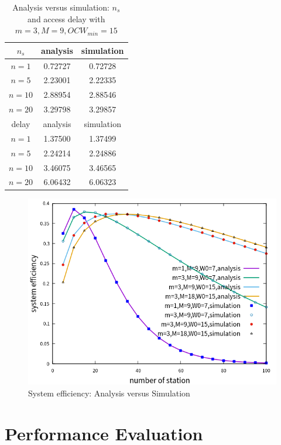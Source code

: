 \documentclass[journal]{IEEEtran}
\begin{document}
\begin{table}[!h]
\caption{Analysis versus simulation: $n_s$ and access delay with $m=3,M=9,OCW_{min} = 15$}
\label{table_val}
\begin{center}
\begin{tabular}{c|c|c}
\hline
$n_s$ 	& analysis 	& simulation \\
\hline
$n=1$ 	& 0.72727  	& 0.72728 \\
$n=5$ 	& 2.23001	& 2.22335 \\
$n=10$	& 2.88954	& 2.88546 \\
$n=20$	& 3.29798	& 3.29857 \\
\hline
delay	& analysis	& simulation \\
\hline
$n=1$ 	& 1.37500  	& 1.37499 \\
$n=5$ 	& 2.24214	& 2.24886 \\
$n=10$	& 3.46075	& 3.46565 \\
$n=20$	& 6.06432	& 6.06323 \\
\hline
\end{tabular}
\end{center}
\end{table}

\begin{figure}[!h]
\includegraphics[scale=0.54]{./figure/multiple_parameter.png}
\caption{System efficiency: Analysis versus Simulation}
\label{validation}
\end{figure}



\section{Performance Evaluation} 	\label{sec_perf_eval}
\end{document}
